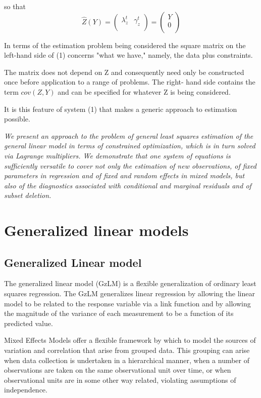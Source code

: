 \documentclass[Main.tex]{subfiles}
\begin{document}
so that
\[ \hat{Z}(Y) =
\left(
\begin{array}{cc}
\lambda_{z}^{t}&
\gamma_z^{t} \\
\end{array}
\right)=\left(
\begin{array}{c}
Y \\
0 \\
\end{array}
\right) \]

In terms of the estimation problem being considered the square matrix on the left-hand side of (1) concerns "what we have," namely, the data plus constraints.

The matrix does not depend on Z and consequently need only be constructed once before application to a range of problems. The right- hand side contains the term $cov(Z,Y)$ and can be specified for whatever Z is being considered.

It is this feature of system (1) that makes a generic approach to estimation possible.


\newpage	
	\emph{
		We present an approach to the problem of general least squares estimation of the general linear model in terms of 
		constrained optimization, which is in turn solved via Lagrange multipliers. We demonstrate that one system of equations is sufficiently versatile to cover not only the estimation of new observations, of fixed parameters in regression and of fixed and random effects in mixed models, but also of the diagnostics associated with conditional and marginal residuals and of subset deletion. 
	}
	
\bigskip

	\chapter{Generalized linear models}
	\section{Generalized Linear model}
The generalized linear model (GzLM) is a flexible generalization of ordinary least squares regression. The GzLM generalizes linear regression by allowing the linear model to be related to the response variable via a link function and by allowing the magnitude of the variance of each measurement to be a function of its predicted value.
	
	
	Mixed Effects Models offer a flexible framework by which to model
	the sources of variation and correlation that arise from grouped
	data. This grouping can arise when data collection is undertaken
	in a hierarchical manner, when a number of observations are taken
	on the same observational unit over time, or when observational
	units are in some other way related, violating assumptions of
	independence.
	
\end{document}
